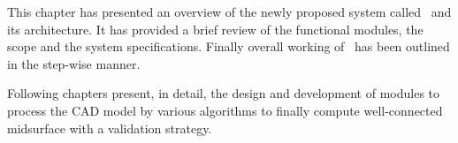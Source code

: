 
This chapter has presented an overview of the newly proposed system called \mysystemname~and its architecture. It has provided a brief review of the functional modules, the scope and the system specifications. Finally overall working of \mysystemname~has been outlined in the step-wise manner.

Following chapters present, in detail, the design and development of modules to process the CAD model by various algorithms to finally compute well-connected midsurface with a validation strategy.  
